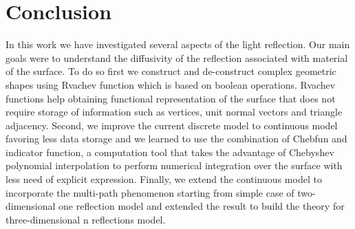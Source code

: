 \documentclass[11pt,reqno]{amsart}
\theoremstyle{definition}
\begin{document}
\section{Conclusion}

In this work we have investigated several aspects of the light reflection. Our main goals were to understand the diffusivity of the reflection associated with material of the surface. To do so first we construct and de-construct complex geometric shapes using Rvachev function which is based on boolean operations. Rvachev functions help obtaining functional representation of the surface that does not require storage of information such as vertices, unit normal vectors and triangle adjacency.
Second, we improve the current discrete model to continuous model favoring less data storage and we learned to use the combination of Chebfun and indicator function, a computation tool that takes the advantage of Chebyshev polynomial interpolation to perform numerical integration over the surface with less need of explicit expression.
Finally, we extend the continuous model to incorporate the multi-path phenomenon starting from simple case of two-dimensional one reflection model and extended the result to build the theory for three-dimensional n reflections model.
\end{document}
